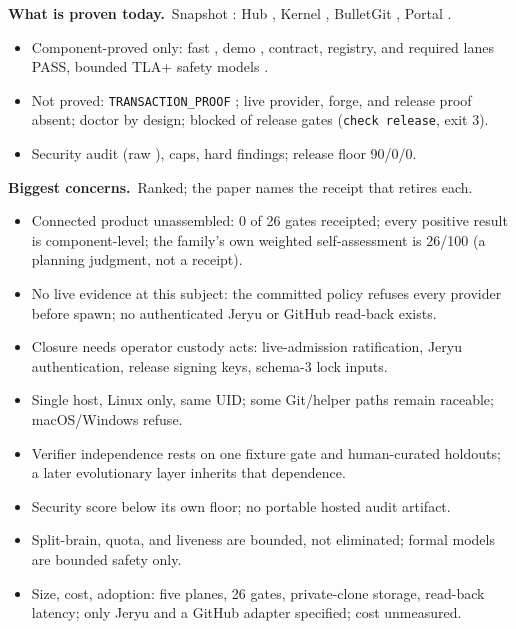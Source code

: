 \documentclass[11pt,letterpaper]{article}
\newenvironment{tight}{\setlength{\topsep}{1pt}\setlength{\partopsep}{0pt}\begin{itemize}\setlength{\itemsep}{1pt}\setlength{\parskip}{0pt}\setlength{\parsep}{0pt}}{\end{itemize}}
\newcommand{\block}[2]{\vspace{1pt}\textbf{#1}{\footnotesize\ #2}\par\vspace{-2pt}}
\begin{document}
\block{What is proven today.}{Snapshot \EvidenceSnapshotId: Hub
\EvidenceHubCommit, Kernel \EvidenceKernelCommit, BulletGit
\EvidenceGitCommit, Portal \EvidencePortalCommit.}
\begin{tight}
\item Component-proved only: fast \EvidenceFastOutcome, demo
\EvidenceDemoOutcome, contract, registry, and required lanes PASS,
\EvidenceFormalModels{} bounded TLA+ safety models \EvidenceFormalOutcome.
\item Not proved: \texttt{TRANSACTION\_PROOF} \EvidenceTransactionOutcome;
live provider, forge, and release proof absent; doctor
\EvidenceDoctorOutcome{} by design; \EvidenceReleaseBlocked{} blocked of
\EvidenceReleaseEvaluated{} release gates (\texttt{check release}, exit 3).
\item Security audit \EvidenceAuditScore{} (raw \EvidenceAuditRaw),
\EvidenceAuditCaps{} caps, \EvidenceAuditHard{} hard findings; release floor 90/0/0.
\end{tight}

\block{Biggest concerns.}{Ranked; the paper names the receipt that retires each.}
\begin{tight}
\item Connected product unassembled: 0 of 26 gates receipted; every positive
result is component-level; the family's own weighted self-assessment is
26/100 (a planning judgment, not a receipt).
\item No live evidence at this subject: the committed policy refuses every
provider before spawn; no authenticated Jeryu or GitHub read-back exists.
\item Closure needs operator custody acts: live-admission ratification, Jeryu
authentication, release signing keys, schema-3 lock inputs.
\item Single host, Linux only, same UID; some Git/helper paths remain raceable; macOS/Windows refuse.
\item Verifier independence rests on one fixture gate and human-curated
holdouts; a later evolutionary layer inherits that dependence.
\item Security score below its own floor; no portable hosted audit artifact.
\item Split-brain, quota, and liveness are bounded, not eliminated; formal models are bounded safety only.
\item Size, cost, adoption: five planes, 26 gates, private-clone storage,
read-back latency; only Jeryu and a GitHub adapter specified; cost unmeasured.
\end{tight}
\end{document}
